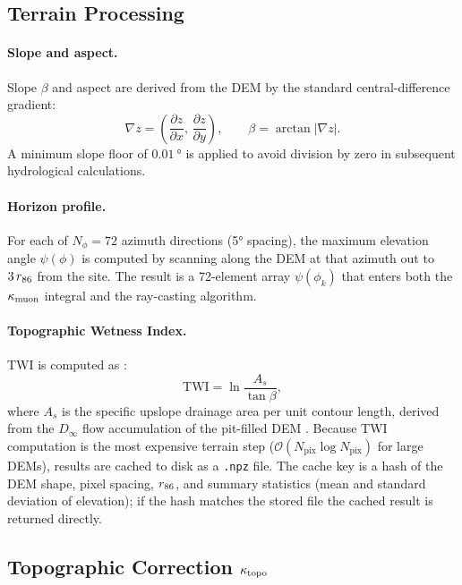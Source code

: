 \subsection{Terrain Processing}
\label{sec:methods:terrain}

\paragraph{Slope and aspect.}
Slope $\beta$ and aspect are derived from the DEM by the standard
central-difference gradient:
\begin{equation}
  \nabla z = \left(\frac{\partial z}{\partial x},\,
                   \frac{\partial z}{\partial y}\right),
  \qquad
  \beta = \arctan|\nabla z|.
\end{equation}
A minimum slope floor of $\SI{0.01}{\degree}$ is applied to avoid
division by zero in subsequent hydrological calculations.

\paragraph{Horizon profile.}
For each of $N_\phi = 72$ azimuth directions (5° spacing), the
maximum elevation angle $\psi(\phi)$ is computed by scanning along
the DEM at that azimuth out to $3\,r_{86}$ from the site.
The result is a 72-element array $\psi(\phi_k)$ that enters both
the $\kappa_\mathrm{muon}$ integral and the ray-casting algorithm.

\paragraph{Topographic Wetness Index.}
TWI is computed as \citep{beven1979}:
\begin{equation}
  \mathrm{TWI} = \ln\frac{A_s}{\tan\beta},
  \label{eq:twi}
\end{equation}
where $A_s$ is the specific upslope drainage area per unit contour
length, derived from the $D_\infty$ flow accumulation of the
pit-filled DEM \citep{wang2006}.
Because TWI computation is the most expensive terrain step
($\mathcal{O}(N_\mathrm{pix}\log N_\mathrm{pix})$ for large DEMs),
results are cached to disk as a \texttt{.npz} file.
The cache key is a hash of the DEM shape, pixel spacing, $r_{86}$,
and summary statistics (mean and standard deviation of elevation);
if the hash matches the stored file the cached result is returned
directly.

\subsection{Topographic Correction \texorpdfstring{$\kappa_\mathrm{topo}$}{kappa\_topo}}
\label{sec:methods:kT}

